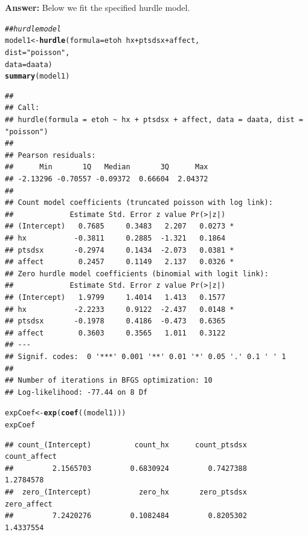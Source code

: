 \documentclass{article}\usepackage[]{graphicx}\usepackage[]{color}
\makeatletter
\newcommand{\hlstr}[1]{\textcolor[rgb]{0.192,0.494,0.8}{#1}}%
\newcommand{\hlcom}[1]{\textcolor[rgb]{0.678,0.584,0.686}{\textit{#1}}}%
\newcommand{\hlopt}[1]{\textcolor[rgb]{0,0,0}{#1}}%
\newcommand{\hlstd}[1]{\textcolor[rgb]{0.345,0.345,0.345}{#1}}%
\newcommand{\hlkwb}[1]{\textcolor[rgb]{0.69,0.353,0.396}{#1}}%
\newcommand{\hlkwc}[1]{\textcolor[rgb]{0.333,0.667,0.333}{#1}}%
\newcommand{\hlkwd}[1]{\textcolor[rgb]{0.737,0.353,0.396}{\textbf{#1}}}%
\newenvironment{kframe}{%
 \def\at@end@of@kframe{}%
 \ifinner\ifhmode%
  \def\at@end@of@kframe{\end{minipage}}%
  \begin{minipage}{\columnwidth}%
 \fi\fi%
 \def\FrameCommand##1{\hskip\@totalleftmargin \hskip-\fboxsep
 \colorbox{shadecolor}{##1}\hskip-\fboxsep
     \hskip-\linewidth \hskip-\@totalleftmargin \hskip\columnwidth}%
 \MakeFramed {\advance\hsize-\width
   \@totalleftmargin\z@ \linewidth\hsize
   \@setminipage}}%
 {\par\unskip\endMakeFramed%
 \at@end@of@kframe}
\newenvironment{knitrout}{}{} %
\makeatother
\begin{document}
{\bf Answer:} Below we fit the specified hurdle model.

\begin{knitrout}
\color{fgcolor}\begin{kframe}
\begin{alltt}
\hlcom{## hurdle model}
\hlstd{model1} \hlkwb{<-} \hlkwd{hurdle}\hlstd{(}\hlkwc{formula} \hlstd{= etoh} \hlopt{~} \hlstd{hx} \hlopt{+} \hlstd{ptsdsx} \hlopt{+} \hlstd{affect,}
                             \hlkwc{dist}    \hlstd{=} \hlstr{"poisson"}\hlstd{,}
                             \hlkwc{data}    \hlstd{= daata)}
\hlkwd{summary}\hlstd{(model1)}
\end{alltt}
\begin{verbatim}
## 
## Call:
## hurdle(formula = etoh ~ hx + ptsdsx + affect, data = daata, dist = "poisson")
## 
## Pearson residuals:
##      Min       1Q   Median       3Q      Max 
## -2.13296 -0.70557 -0.09372  0.66604  2.04372 
## 
## Count model coefficients (truncated poisson with log link):
##             Estimate Std. Error z value Pr(>|z|)  
## (Intercept)   0.7685     0.3483   2.207   0.0273 *
## hx           -0.3811     0.2885  -1.321   0.1864  
## ptsdsx       -0.2974     0.1434  -2.073   0.0381 *
## affect        0.2457     0.1149   2.137   0.0326 *
## Zero hurdle model coefficients (binomial with logit link):
##             Estimate Std. Error z value Pr(>|z|)  
## (Intercept)   1.9799     1.4014   1.413   0.1577  
## hx           -2.2233     0.9122  -2.437   0.0148 *
## ptsdsx       -0.1978     0.4186  -0.473   0.6365  
## affect        0.3603     0.3565   1.011   0.3122  
## ---
## Signif. codes:  0 '***' 0.001 '**' 0.01 '*' 0.05 '.' 0.1 ' ' 1 
## 
## Number of iterations in BFGS optimization: 10 
## Log-likelihood: -77.44 on 8 Df
\end{verbatim}
\begin{alltt}
\hlstd{expCoef} \hlkwb{<-} \hlkwd{exp}\hlstd{(}\hlkwd{coef}\hlstd{((model1)))}
\hlstd{expCoef}
\end{alltt}
\begin{verbatim}
## count_(Intercept)          count_hx      count_ptsdsx      count_affect 
##         2.1565703         0.6830924         0.7427388         1.2784578 
##  zero_(Intercept)           zero_hx       zero_ptsdsx       zero_affect 
##         7.2420276         0.1082484         0.8205302         1.4337554
\end{verbatim}
\end{kframe}
\end{knitrout}
\end{document}
